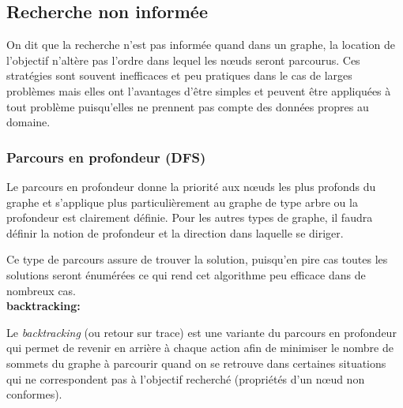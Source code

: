 


\subsection{Recherche non informée}
On dit que la recherche n'est pas informée quand dans un graphe, la location de l'objectif n'altère pas l'ordre dans lequel les nœuds seront parcourus.
Ces stratégies sont souvent inefficaces et peu pratiques dans le cas de larges problèmes mais elles ont l'avantages d'être simples et peuvent être appliquées à tout problème puisqu'elles ne prennent  pas compte des données propres au domaine.

\subsubsection{Parcours en profondeur (DFS)}
Le parcours en profondeur donne la priorité aux nœuds les plus profonds du graphe et s'applique plus particulièrement au graphe de type arbre ou la profondeur est clairement définie.
Pour les autres types de graphe, il faudra définir la notion de profondeur et la direction dans laquelle se diriger.

Ce type de parcours assure de trouver la solution, puisqu'en pire cas toutes les solutions seront énumérées ce qui rend cet algorithme peu efficace dans de nombreux cas.\\

{\setlength{\parindent}{0cm}\textbf{backtracking:}}

Le \textit{backtracking} (ou retour sur trace) est une variante du parcours en profondeur qui permet de revenir en arrière à chaque action afin de minimiser le nombre de sommets du graphe à parcourir quand on se retrouve dans certaines situations qui ne correspondent pas à l'objectif recherché (propriétés d'un nœud non conformes).


